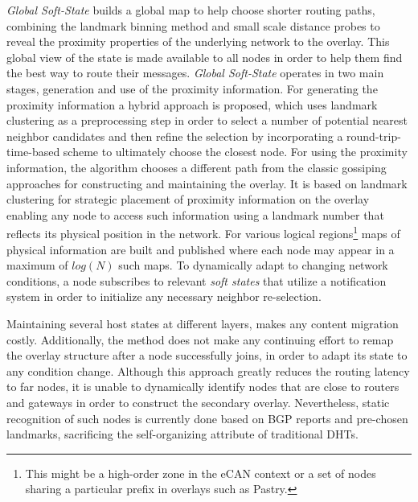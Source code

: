 \textit{Global Soft-State} \cite{XTZ2003} builds a global map to help
choose shorter routing paths, combining the landmark binning method and small
scale distance probes to reveal the proximity properties of the underlying
network to the overlay. %
This global view of the
state is made available to all nodes in order to help them find the best way to
route their messages. \textit{Global Soft-State} operates in two main stages,
generation and use of the proximity information. For generating the proximity
information a hybrid approach is proposed, which uses landmark clustering as a
preprocessing step in order to select a number of potential nearest neighbor
candidates and then refine the selection by incorporating a
round-trip-time-based scheme to ultimately choose the closest node. For using
the proximity information, the algorithm chooses a different path from the
classic gossiping approaches for constructing and maintaining the overlay. It is
based on landmark clustering for strategic placement of proximity information on
the overlay enabling any node to access such information using a landmark number
that reflects its physical position in the network. For various logical
regions\footnote{This might be a high-order zone in the eCAN\cite{xu_ecan_2002}
context or a set of nodes sharing a particular prefix in overlays such as
Pastry\cite{antony_pastry_2001}.} maps of physical information are built and
published where each node may appear in a maximum of $log\left( N \right)$ such
maps. To dynamically adapt to changing network conditions, a node subscribes to
relevant \emph{soft states} that utilize a notification system in order to
initialize any necessary neighbor re-selection.

Maintaining several host states at different layers, makes any content migration
costly. Additionally, the method does not make any continuing effort to remap
the overlay structure after a node successfully joins, in order to adapt its
state to any condition change. Although this approach greatly reduces the
routing latency to far nodes, it is unable to dynamically identify nodes that
are close to routers and gateways in order to construct the secondary overlay.
Nevertheless, static recognition of such nodes is currently done based on BGP
reports and pre-chosen landmarks, sacrificing the self-organizing attribute of
traditional DHTs.

